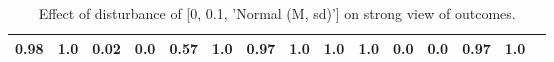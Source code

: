 \begin{table}
\begin{tabular}{l|cc|cc|cc|cc|cc|cc|cc}
\cellcolor{Bittersweet}0.98&\cellcolor{Bittersweet}1.0&\cellcolor{Bittersweet}0.02&\cellcolor{Bittersweet}0.0&0.57&1.0&\cellcolor{Bittersweet}0.97&\cellcolor{Bittersweet}1.0&\cellcolor{Bittersweet}1.0&\cellcolor{Bittersweet}1.0&\cellcolor{Bittersweet}0.0&\cellcolor{Bittersweet}0.0&\cellcolor{Bittersweet}0.97&\cellcolor{Bittersweet}1.0\\\bottomrule\end{tabular}\caption{Effect of disturbance of [0, 0.1, 'Normal (M, sd)'] on strong view of outcomes.}\end{table}